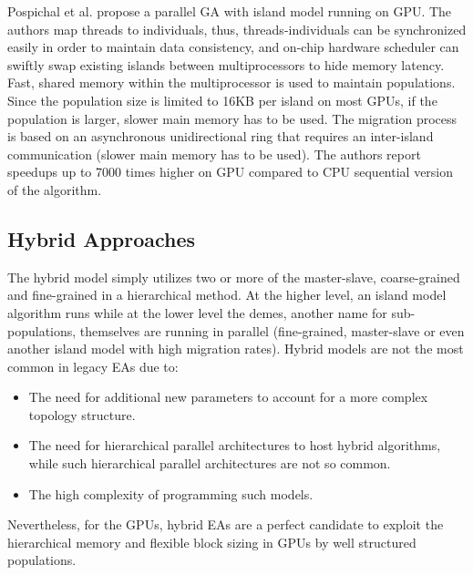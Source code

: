 \documentclass[prodmode,acmtecs]{acmsmall}
\begin{document}
Pospichal et al. \cite{pospichalParallelGeneticAlgorithOnCUDA2010,9253} propose a parallel GA with island model running on GPU. The authors map threads to individuals, thus, threads-individuals can be synchronized easily in order to maintain data consistency, and on-chip hardware scheduler can swiftly swap existing islands between multiprocessors to hide memory latency. Fast, shared memory within the multiprocessor is used to maintain populations.
Since the population size is limited to 16KB per island on most GPUs, if the population is larger, slower main memory has to be used. The migration process is based on an asynchronous unidirectional ring that requires an inter-island communication (slower main memory has to be used). The authors report speedups up to 7000 times higher on GPU compared to CPU sequential version of the algorithm.

\subsection{Hybrid Approaches}

The hybrid model simply utilizes two or more of the master-slave, coarse-grained and fine-grained in a hierarchical method. At the higher level, an island model algorithm runs while at the lower level the demes, another name for sub-populations, themselves are running in parallel (fine-grained, master-slave or even another island model with high migration rates). Hybrid models are not the most common in legacy EAs due to:
\begin{itemize}
 \item The need for additional new parameters to account for a more complex topology structure. 
 \item The need for hierarchical parallel architectures to host hybrid algorithms, while such hierarchical parallel architectures are not so common. 
\item The high complexity of programming such models. 
\end{itemize}

Nevertheless, for the GPUs, hybrid EAs are a perfect candidate to exploit the hierarchical memory and flexible block sizing in GPUs by well structured populations. 
\end{document}
